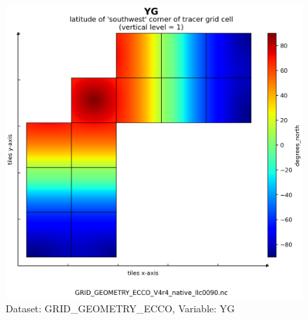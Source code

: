 \begin{figure}[H]
\centering
\includegraphics[scale=0.55]{../images/plots/native_plots_coords/Geometry_Parameters_for_the_Lat-Lon-Cap_90_(llc90)_Native_Model_Grid_(Version_4_Release_4)/YG.png}
\caption{Dataset: GRID\_GEOMETRY\_ECCO, Variable: YG}
\label{tab:table-GRID_GEOMETRY_ECCO_YG-Plot}
\end{figure}
\newpage
\pagebreak
